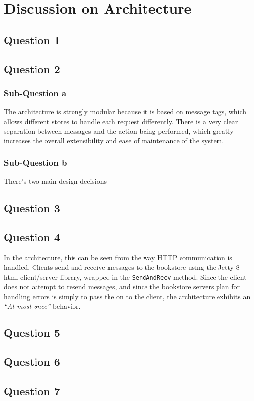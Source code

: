 
\section{Discussion on Architecture}

\subsection{Question 1}

\subsection{Question 2}

\subsubsection{Sub-Question a}

The architecture is strongly modular because it is based on message tags, which
allows different stores to handle each request differently. There is a very
clear separation between messages and the action being performed, which greatly
increases the overall extensibility and ease of maintenance of the system.

\subsubsection{Sub-Question b}

There's two main design decisions

\subsection{Question 3}

\subsection{Question 4}

In the architecture, this can be seen from the way HTTP communication is handled. Clients send and receive messages to the bookstore using the Jetty 8 html client/server library, wrapped in the {\tt SendAndRecv} method. Since the client does not attempt to resend messages, and since the bookstore servers plan for handling errors is simply to pass the on to the client, the architecture exhibits an {\it ``At most once''} behavior.

\subsection{Question 5}

\subsection{Question 6}

\subsection{Question 7}


